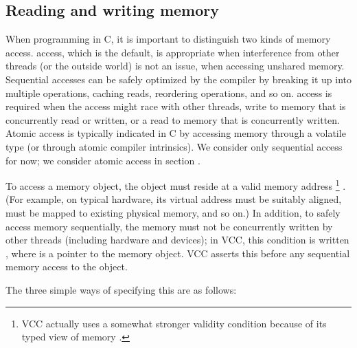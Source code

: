 \subsection{Reading and writing memory}
\label{sect:writes}

When programming in C, it is important to distinguish two kinds of
memory access.  access, which is the default, is appropriate when
interference from other threads (or the outside world) is not an
issue, \eg when accessing unshared memory. Sequential accesses can be
safely optimized by the compiler by breaking it up into multiple
operations, caching reads, reordering operations, and so on. 
 access is required when the access might race with other
threads, \ie write to memory that is concurrently read or written,
or a read to memory that is concurrently written. Atomic access is typically
indicated in C by accessing memory through a volatile type (or through atomic 
compiler intrinsics). We consider only sequential 
access for now; we consider atomic access in section .

To access a memory object, the object must reside at a valid memory address%
\footnote{VCC actually uses a somewhat stronger validity condition because of 
its typed view of memory .
}%
. (For example, on typical hardware, its virtual address must be suitably aligned,
must be mapped to existing physical memory, and so on.) 
In addition, to safely access memory sequentially, the memory must not be concurrently
written by other threads (including hardware and devices); in VCC, this condition is written
, where  is a pointer to the memory object. VCC asserts this 
before any sequential memory access to the object. 

The three simple ways of specifying this are as follows:

